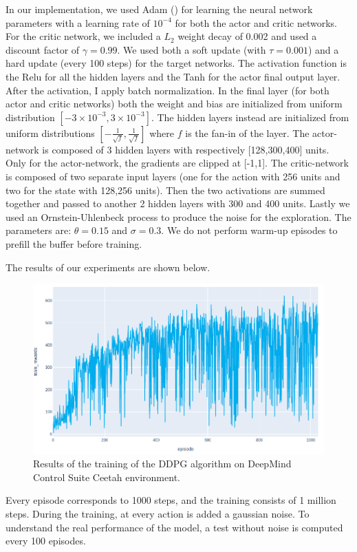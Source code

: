 In our implementation, we used Adam (\cite{kingma2014adam}) for learning the neural network parameters with a learning rate of $10^{-4}$ for both the actor and critic networks.
For the critic network, we included a $L_2$ weight decay of 0.002 and used a discount factor of $\gamma = 0.99$. 
We used both a soft update (with $\tau = 0.001$) and a hard update (every 100 steps) for the target networks. 
The activation function is the Relu for all the hidden layers and the Tanh for the actor final output layer.
After the activation, I apply batch normalization.
In the final layer (for both actor and critic networks) both the weight and bias are initialized from uniform distribution $\left[-3 \times 10^{-3}, 3 \times 10^{-3}\right]$.
The hidden layers instead are initialized from uniform distributions $\left[-\frac{1}{\sqrt{f}}, \frac{1}{\sqrt{f}}\right]$ where $f$ is the fan-in of the layer.
The actor-network is composed of 3 hidden layers with respectively [128,300,400] units.
Only for the actor-network, the gradients are clipped at [-1,1].
The critic-network is composed of two separate input layers (one for the action with 256 units and two for the state with 128,256 units). 
Then the two activations are summed together and passed to another 2 hidden layers with 300 and 400 units.
Lastly we used an Ornstein-Uhlenbeck process to produce the noise for the exploration. The parameters are: $\theta = 0.15$ and $\sigma = 0.3$.
We do not perform warm-up episodes to prefill the buffer before training.

The results of our experiments are shown below.
\begin{figure}[H]
\centering
\includegraphics[width=1.\textwidth, height=.35\textheight]{pictures/ddpg_train_rew_with_feature_state}
\caption{ Results of the training of the DDPG algorithm on DeepMind Control Suite Ceetah environment.}
\end{figure}
Every episode corresponds to 1000 steps, and the training consists of 1 million steps.
During the training, at every action is added a gaussian noise.
To understand the real performance of the model, a test without noise is computed every 100 episodes.

